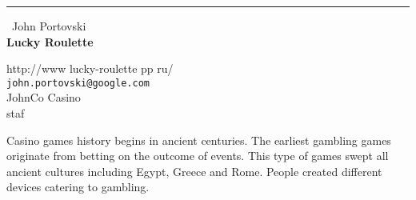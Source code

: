 \documentclass{report}
\begin{document}
\begin{center}
\rule{6in}{1pt} \
{\large John Portovski \\
{\bf Lucky Roulette}}

http://www lucky-roulette pp ru/
\\
{\tt john.portovski@google.com}\\
 JohnCo Casino\\
	staf\end{center}

Casino games history begins in ancient centuries. The earliest gambling
games originate from betting on the outcome of events. This type of games
swept all ancient cultures including Egypt, Greece and Rome. People
created different devices catering to gambling.
\end{document}
